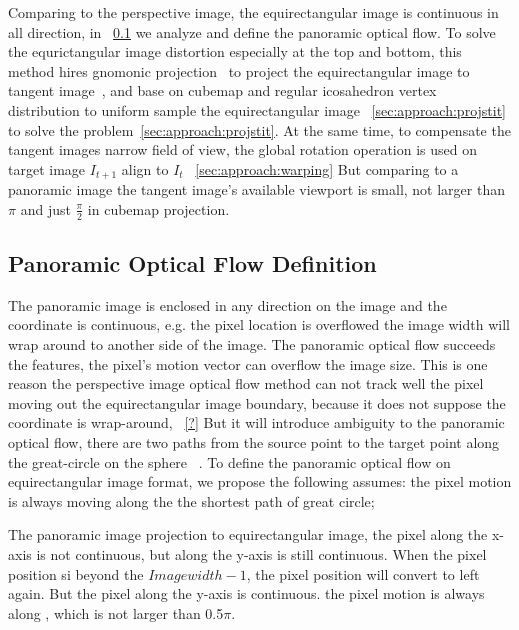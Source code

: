 % 
Comparing to the perspective image, the equirectangular image is continuous in all direction, in ~\cref{sec:approach:definition} we analyze and define the panoramic optical flow.
%
To solve the equrictangular image distortion especially at the top and bottom, this method hires gnomonic projection~\cite{?} to project the equirectangular image to tangent image~\cite{?}, and base on cubemap and regular icosahedron vertex distribution to uniform sample the equirectangular image ~\cref{sec:approach:projstit} to solve the problem~\cref{sec:approach:projstit}.
%
At the same time, to compensate the tangent images narrow field of view, the global rotation operation is used on target image $I_{t+1}$ align to $I_t$ ~\cref{sec:approach:warping}
But comparing to a panoramic image the tangent image's available viewport is small, not larger than $\pi$ and just $\frac{\pi}{2}$ in cubemap projection.

\subsection{Panoramic Optical Flow Definition}
\label{sec:approach:definition}

The panoramic image is enclosed in any direction on the image and the coordinate is continuous, e.g. the pixel location is overflowed the image width will wrap around to another side of the image.
The panoramic optical flow succeeds the features, the pixel's motion vector can overflow the image size.
This is one reason the perspective image optical flow method can not track well the pixel moving out the equirectangular image boundary, because it does not suppose the coordinate is wrap-around, ~\cref{?}
%
But it will introduce ambiguity to the panoramic optical flow, 
there are two paths from the source point to the target point along the great-circle on the sphere ~\cite{??}.
To define the panoramic optical flow on equirectangular image format, we propose the following assumes:
the pixel motion is always moving along the the shortest path of great circle;

The panoramic image projection to equirectangular image, the pixel along the x-axis is not continuous, but along the y-axis is still continuous. When the pixel position si beyond the  ${Imagewidth -1}$, the pixel position will convert to left again.
But the pixel along the y-axis is continuous.
the pixel motion is always along , which is not larger than 0.5$\pi$.

